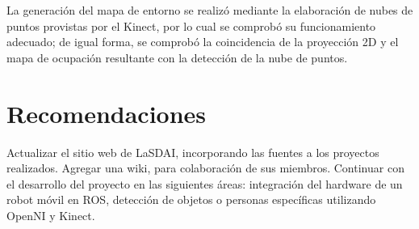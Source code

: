 La generación del mapa de entorno se realizó mediante la elaboración de nubes de puntos provistas por el Kinect, por lo cual se comprobó su funcionamiento adecuado; de igual forma, se comprobó la coincidencia de la proyección 2D y el mapa de ocupación resultante con la detección de la nube de puntos.

\section{Recomendaciones}

Actualizar el sitio web de LaSDAI, incorporando las fuentes a los proyectos realizados.
Agregar una wiki, para colaboración de sus miembros. Continuar con el desarrollo del proyecto en las siguientes áreas: integración del hardware de un robot móvil en ROS, detección de objetos o personas específicas utilizando OpenNI y Kinect.
